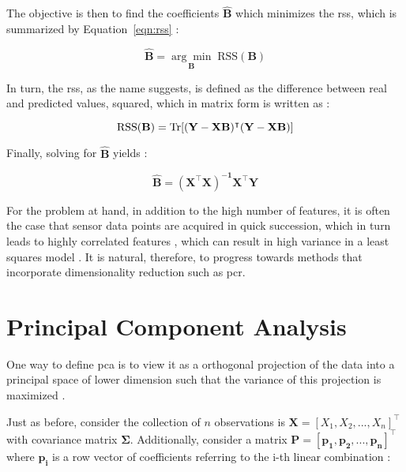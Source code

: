 The objective is then to find the coefficients $\mathbf{\hat{B}}$ which minimizes the \acrfull{rss}, which is summarized by Equation~\ref{eqn:rss} \parencite{friedman2001}:

\begin{equation}
	\label{eqn:betahat}
	\mathbf{\hat{B}} = \underset{\mathbf{B}}{\arg\min} 	\; \text{RSS}(\mathbf{B})
\end{equation}

In turn, the \acrshort{rss}, as the name suggests, is defined as the difference between real and predicted values, squared, which in matrix form is written as \parencite{friedman2001}:

\begin{equation} 
	\label{eqn:rss}
	\text{RSS}(\mathbf{B}) = \operatorname{Tr} [\mathbf{(Y-XB)^\intercal (Y-XB)}]
\end{equation}

Finally, solving for $\mathbf{\hat{B}}$ yields \parencite{friedman2001}:

\begin{equation}
	\label{eqn:ols_beta}
	\mathbf{\hat{B}} = \mathbf{(X^\intercal X)^{-1} X^\intercal Y}
\end{equation}

For the problem at hand, in addition to the high number of features, it is often the case that sensor data points are acquired in quick succession, which in turn leads to highly correlated features \parencite{Bastuck_2019}, which can result in high variance in a least squares model \parencite{friedman2001}. It is natural, therefore, to progress towards methods that incorporate dimensionality reduction such as \acrfull{pcr}.

\section{Principal Component Analysis}
\label{sec:pca}

One way to define \acrfull{pca} is to view it as a orthogonal projection of the data into a principal space of lower dimension such that the variance of this projection is maximized \parencite{bishop2006pattern}.

Just as before, consider the  collection of $n$ observations is $\mathbf{X} = [X_1, X_2, ..., X_n]^\intercal$ with covariance matrix $\mathbf{\Sigma}$. Additionally, consider a matrix $\mathbf{P = [p_1, p_2, ..., p_n]^\intercal}$ where $\mathbf{p_i}$ is a row vector of coefficients referring to the i-th linear combination \parencite{johnson2013applied}:

